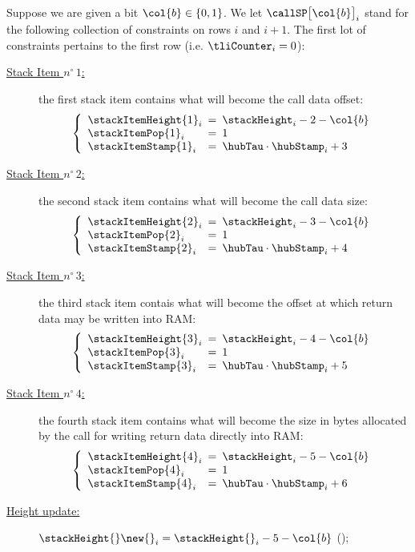 

Suppose we are given a bit $\col{b} \in \{ 0, 1\}$.
We let $\callSP\big[\col{b}\big]_{i}$ stand for the following collection of constraints on rows $i$ and $i+1$.
The first lot of constraints pertains to the first row (i.e. $\tliCounter_{i} = 0$):
\begin{description}
	\item[\underline{Stack Item $n^\circ\,1$:}] the first stack item contains what will become the call data offset:
	\[
	\left\{
	\begin{array}{lcl}
		\stackItemHeight{1}_{i}	& \!\!\! = \!\!\! & \stackHeight_{i} - 2 - \col{b} \\
		\stackItemPop{1}_{i}	& \!\!\! = \!\!\! & 1 \\
		\stackItemStamp{1}_{i}	& \!\!\! = \!\!\! & \hubTau \cdot \hubStamp_{i} + 3 \\
	\end{array}
	\right.
	\]
	\item[\underline{Stack Item $n^\circ\,2$:}] the second stack item contains what will become the call data size:
	\[
	\left\{
	\begin{array}{lcl}
		\stackItemHeight{2}_{i}	& \!\!\! = \!\!\! & \stackHeight_{i} - 3 - \col{b} \\
		\stackItemPop{2}_{i}	& \!\!\! = \!\!\! & 1 \\
		\stackItemStamp{2}_{i}	& \!\!\! = \!\!\! & \hubTau \cdot \hubStamp_{i} + 4 \\
	\end{array}
	\right.
	\]
	\item[\underline{Stack Item $n^\circ\,3$:}] the third stack item contais what will become the offset at which return data may be written into RAM:
	\[
	\left\{
	\begin{array}{lcl}
		\stackItemHeight{3}_{i}	& \!\!\! = \!\!\! & \stackHeight_{i} - 4 - \col{b} \\
		\stackItemPop{3}_{i}	& \!\!\! = \!\!\! & 1 \\
		\stackItemStamp{3}_{i}	& \!\!\! = \!\!\! & \hubTau \cdot \hubStamp_{i} + 5 \\
	\end{array}
	\right.
	\]
	\item[\underline{Stack Item $n^\circ\,4$:}] the fourth stack item contains what will become the size in bytes allocated by the call for writing return data directly into RAM:
	\[
	\left\{
	\begin{array}{lcl}
		\stackItemHeight{4}_{i}	& \!\!\! = \!\!\! & \stackHeight_{i} - 5 - \col{b} \\
		\stackItemPop{4}_{i}	& \!\!\! = \!\!\! & 1 \\
		\stackItemStamp{4}_{i}	& \!\!\! = \!\!\! & \hubTau \cdot \hubStamp_{i} + 6 \\
	\end{array}
	\right.
	\]
	\item[\underline{Height update:}] $\stackHeight{}\new{}_{i} = \stackHeight{}_{i} - 5 - \col{b}$ \quad (\sanityCheck);
\end{description}
